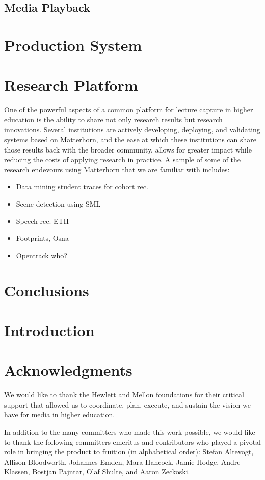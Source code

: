 \documentclass{sig-alternate}
\begin{document}
\subsection{Media Playback}

\section{Production System}
\section{Research Platform}
One of the powerful aspects of a common platform for lecture capture in higher education is the ability to share not only research results but research innovations.  Several institutions are actively developing, deploying, and validating systems based on Matterhorn, and the ease at which these institutions can share those results back with the broader community, allows for greater impact while reducing the costs of applying research in practice.
A sample of some of the research endevours using Matterhorn that we are familiar with includes:
\begin{itemize}
\item Data mining student traces for cohort rec.
\item Scene detection using SML
\item Speech rec. ETH
\item Footprints, Osna
\item Opentrack who?
\end{itemize}

\section{Conclusions}

\section{Introduction}


\section{Acknowledgments}
We would like to thank the Hewlett and Mellon foundations for their critical support that allowed us to coordinate, plan, execute, and sustain the vision we have for media in higher education.

In addition to the many committers who made this work possible, we would like to thank the following committers emeritus and contributors who played a pivotal role in bringing the product to fruition (in alphabetical order): Stefan Altevogt, Allison Bloodworth, Johannes Emden, Mara Hancock, Jamie Hodge, Andre Klassen, Bostjan Pajntar, Olaf Shulte, and Aaron Zeckoski.
\end{document}
